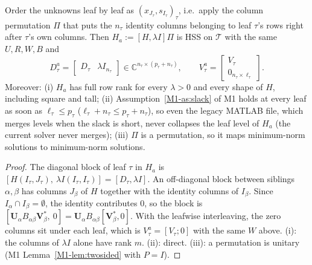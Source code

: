 \begin{lemma}\label{lem:augstruct}
Order the unknowns leaf by leaf as $(x_{J_\tau},s_{I_\tau})_\tau$, i.e.\ apply the column permutation
$\Pi$ that puts the $n_\tau$ identity columns belonging to leaf $\tau$'s rows right after $\tau$'s
own columns. Then $H_a:=[H,\lambda I]\Pi$ is HSS on $\mathcal T$ with the same $U,R,W,B$ and
\[
D_\tau^{a}=\begin{bmatrix}D_\tau & \lambda I_{n_\tau}\end{bmatrix}\in\mathbb{C}^{n_\tau\times(p_\tau+n_\tau)},\qquad
V_\tau^{a}=\begin{bmatrix}V_\tau\\ 0_{n_\tau\times\ell_\tau}\end{bmatrix}.
\]
Moreover: (i) $H_a$ has full row rank for every $\lambda>0$ and every shape of $H$, including square
and tall; (ii) Assumption~\ref{M1-as:slack} of M1 holds at every leaf as soon as $\ell_\tau\le p_\tau$
($\ell_\tau+n_\tau\le p_\tau+n_\tau$), so even the legacy MATLAB file, which merges levels when the slack
is short, never collapses the leaf level of $H_a$ (the current solver never merges); (iii) $\Pi$ is a permutation, so it maps minimum-norm solutions to minimum-norm solutions.
\end{lemma}
\begin{proof}
The diagonal block of leaf $\tau$ in $H_a$ is $[H(I_\tau,J_\tau),\ \lambda I(I_\tau,I_\tau)]=[D_\tau,\lambda I]$.
An off-diagonal block between siblings $\alpha,\beta$ has columns $J_\beta$ of $H$ together with the identity
columns of $I_\beta$. Since $I_\alpha\cap I_\beta=\emptyset$, the identity contributes $0$, so the block is
$[\mathbf U_\alpha B_{\alpha\beta}\mathbf V_\beta^*,\ 0]=\mathbf U_\alpha B_{\alpha\beta}[\mathbf V_\beta^*,0]$. With
the leafwise interleaving, the zero columns sit under each leaf, which is $V_\tau^a=[V_\tau;0]$ with the
same $W$ above. (i): the columns of $\lambda I$ alone have rank $m$. (ii): direct. (iii): a permutation is
unitary (M1 Lemma~\ref{M1-lem:twosided} with $P=I$).
\end{proof}

